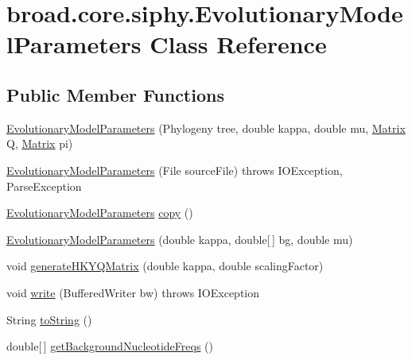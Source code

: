 \hypertarget{classbroad_1_1core_1_1siphy_1_1_evolutionary_model_parameters}{\section{broad.\+core.\+siphy.\+Evolutionary\+Model\+Parameters Class Reference}
\label{classbroad_1_1core_1_1siphy_1_1_evolutionary_model_parameters}
}
\subsection*{Public Member Functions}
\begin{DoxyCompactItemize}
\item 
\hyperlink{classbroad_1_1core_1_1siphy_1_1_evolutionary_model_parameters_ae7f0f1f0521a0bee0f33fe83f76bf7ea}{Evolutionary\+Model\+Parameters} (Phylogeny tree, double kappa, double mu, \hyperlink{class_jama_1_1_matrix}{Matrix} Q, \hyperlink{class_jama_1_1_matrix}{Matrix} pi)
\item 
\hyperlink{classbroad_1_1core_1_1siphy_1_1_evolutionary_model_parameters_aafa5457188028b439cacd7ffb1cc6eb5}{Evolutionary\+Model\+Parameters} (File source\+File)  throws I\+O\+Exception, Parse\+Exception 
\item 
\hyperlink{classbroad_1_1core_1_1siphy_1_1_evolutionary_model_parameters}{Evolutionary\+Model\+Parameters} \hyperlink{classbroad_1_1core_1_1siphy_1_1_evolutionary_model_parameters_a0734fcf5d3102b10ade0f7faf0f12177}{copy} ()
\item 
\hyperlink{classbroad_1_1core_1_1siphy_1_1_evolutionary_model_parameters_a58e922b9ac8c02c22373333ceffb5c39}{Evolutionary\+Model\+Parameters} (double kappa, double\mbox{[}$\,$\mbox{]} bg, double mu)
\item 
void \hyperlink{classbroad_1_1core_1_1siphy_1_1_evolutionary_model_parameters_aeb7a76e925192294fa01f8f5d1801743}{generate\+H\+K\+Y\+Q\+Matrix} (double kappa, double scaling\+Factor)
\item 
void \hyperlink{classbroad_1_1core_1_1siphy_1_1_evolutionary_model_parameters_a0ca5de9a56d88d2d911db3acd8d625ae}{write} (Buffered\+Writer bw)  throws I\+O\+Exception 
\item 
String \hyperlink{classbroad_1_1core_1_1siphy_1_1_evolutionary_model_parameters_abe0fc4e71fe369969dffc54e5423a05b}{to\+String} ()
\item 
double\mbox{[}$\,$\mbox{]} \hyperlink{classbroad_1_1core_1_1siphy_1_1_evolutionary_model_parameters_a94dcc6d7e8cf0e6c79b209d881d2f07a}{get\+Background\+Nucleotide\+Freqs} ()

\end{DoxyCompactItemize}
